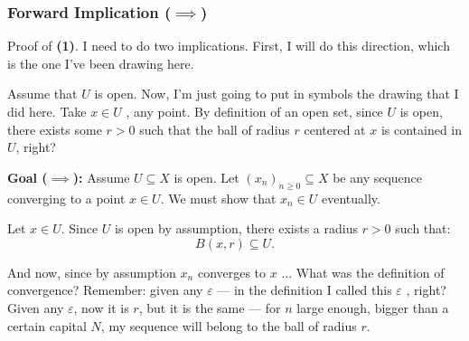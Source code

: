 \begin{proofWrapper}

\subsubsection{Forward Implication (\texorpdfstring{$\implies$}{=>})}

\begin{speech}[00:43:55 - 00:45:06]
Proof of \textbf{(1)}.  I need to do two implications. First, I will do this direction, which is the one I've been drawing here.

Assume that $U$ is open. Now, I'm just going to put in symbols the drawing that I did here. Take $x \in U$ , any point. By definition of an open set, since $U$ is open, there exists some $r > 0$ such that the ball of radius $r$ centered at $x$ is contained in $U$, right? 
\end{speech}

\begin{content}
\textbf{Goal ($\implies$):} Assume $U \subseteq X$ is open. Let $(x_n)_{n \ge 0} \subseteq X$ be any sequence converging to a point $x \in U$. We must show that $x_n \in U$ eventually.

\par\vspace{1ex}\noindent
Let $x \in U$. Since $U$ is open by assumption, there exists a radius $r > 0$ such that:
\begin{equation}\label{eq:ball-inside-U}
B(x, r) \subseteq U.
\end{equation}
\end{content}

\begin{speech}[00:45:06 - 00:46:58]
And now, since by assumption $x_n$ converges to $x$ ... What was the definition of convergence? Remember: given any $\varepsilon$ --- in the definition I called this $\varepsilon$ , right? Given any $\varepsilon$, now it is $r$, but it is the same --- for $n$ large enough, bigger than a certain capital $N$, my sequence will belong to the ball of radius $r$.


\end{speech}
\end{proofWrapper}
